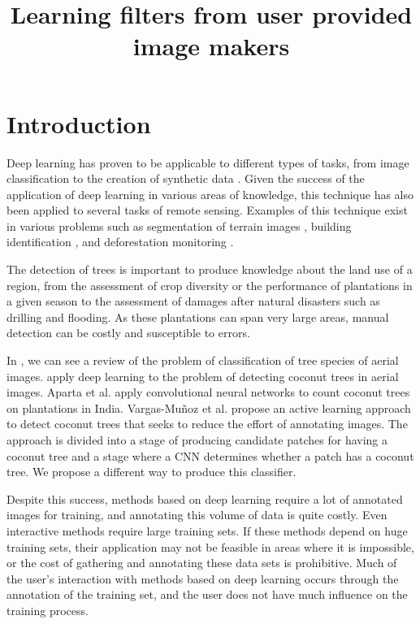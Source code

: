 \documentclass[a4paper,conference]{IEEEtran}
\begin{document}
\title{Learning filters from user provided image makers}

\maketitle

\begin{abstract}
    
\end{abstract}

\section{Introduction}
Deep learning has proven to be applicable to different types of tasks, from image classification to the creation of synthetic data \cite{goodfellow2016deep}. Given the success of the application of deep learning in various areas of knowledge, this technique has also been applied to several tasks of remote sensing. Examples of this technique exist in various problems such as segmentation of terrain images \cite{kemker2018algorithms, kampffmeyer2016semantic, hamaguchi2018effective}, building identification \cite{xu2018building, lu2018detecting, liu2018multilevel}, and deforestation monitoring \cite{bragilevsky2017deep}. 

The detection of trees is important to produce knowledge about the land use of a region, from the assessment of crop diversity or the performance of plantations in a given season to the assessment of damages after natural disasters such as drilling and flooding. As these plantations can span very large areas, manual detection can be costly and susceptible to errors. 

In \cite{fassnacht2016review}, we can see a review of the problem of classification of tree species of aerial images. \cite{puttemans2018comparing} apply deep learning to the problem of detecting coconut trees in aerial images. Aparta et al. \cite{aparna2018cnn} apply convolutional neural networks to count coconut trees on plantations in India. Vargas-Muñoz et al. \cite{8899005} propose an active learning approach to detect coconut trees that seeks to reduce the effort of annotating images. The \cite{8899005} approach is divided into a stage of producing candidate patches for having a coconut tree and a stage where a CNN determines whether a patch has a coconut tree. We propose a different way to produce this classifier.  

Despite this success, methods based on deep learning require a lot of annotated images for training, and annotating this volume of data is quite costly. Even interactive methods require large training sets. If these methods depend on huge training sets, their application may not be feasible in areas where it is impossible, or the cost of gathering and annotating these data sets is prohibitive. Much of the user's interaction with methods based on deep learning occurs through the annotation of the training set, and the user does not have much influence on the training process.
\end{document}
